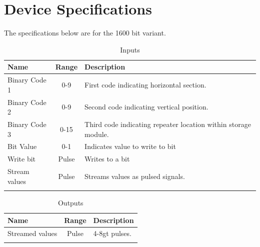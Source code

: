 \documentclass[10pt]{datasheet}
\begin{document}
\onecolumn

\section{Device Specifications}

The specifications below are for the 1600 bit variant.

\begin{table}[h]
    \caption{Inputs}
    \begin{tabularx}{\textwidth}{l | c | X}
        \thickhline
        \textbf{Name} & \textbf{Range} & \textbf{Description} \\
        \hline
        Binary Code 1 & 0-9 & First code indicating horizontal section. \\
        Binary Code 2 & 0-9 & Second code indicating vertical position. \\
        Binary Code 3 & 0-15 & Third code indicating repeater location within storage module. \\
        \hline
        Bit Value & 0-1 & Indicates value to write to bit\\
        \hline
        Write bit & Pulse & Writes to a bit \\
        Stream values & Pulse & Streams values as pulsed signals. \\
        \thickhline
\end{tabularx}
\end{table}

\begin{table}[h]
    \caption{Outputs}
    \begin{tabularx}{\textwidth}{l | c | X}
        \thickhline
        \textbf{Name} & \textbf{Range} & \textbf{Description} \\
        \hline
        Streamed values & Pulse & 4-8gt pulses. \\
        \thickhline
\end{tabularx}
\end{table}
\end{document}
